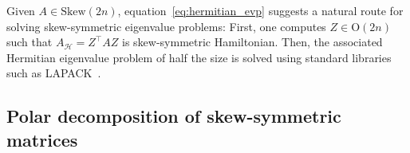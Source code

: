 \documentclass[final,onefignum,onetabnum,dvipsnames]{siamart251216}
\numberwithin{algorithm}{section}
\numberwithin{equation}{section}
\begin{document}

Given $A \in\mathrm{Skew}(2n)$, equation~\eqref{eq:hermitian_evp} suggests a natural route for solving skew-symmetric eigenvalue problems: First, one computes $Z \in \mathrm{O}(2n)$ such that $A_\mathcal{H} = Z^\top A Z$ is skew-symmetric Hamiltonian. Then, the associated Hermitian eigenvalue problem of half the size is solved using standard libraries such as LAPACK~\cite{lapack99}. 


\subsection{Polar decomposition of skew-symmetric matrices}
\end{document}
